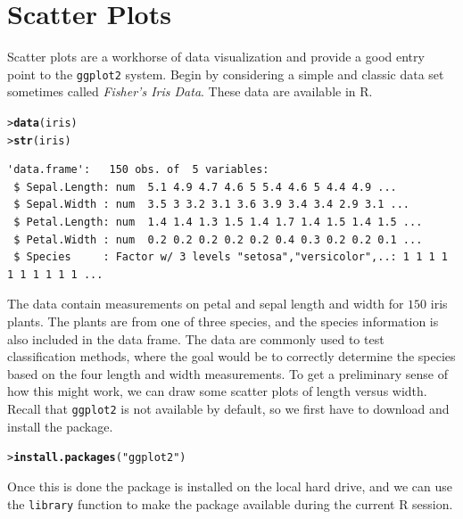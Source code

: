 \documentclass[12pt,oneside]{book}\usepackage[]{graphicx}\usepackage[]{color}
\makeatletter
\newcommand{\hlstr}[1]{\textcolor[rgb]{0.192,0.494,0.8}{#1}}%
\newcommand{\hlstd}[1]{\textcolor[rgb]{0.345,0.345,0.345}{#1}}%
\newcommand{\hlkwd}[1]{\textcolor[rgb]{0.737,0.353,0.396}{\textbf{#1}}}%
\newenvironment{kframe}{%
 \def\at@end@of@kframe{}%
 \ifinner\ifhmode%
  \def\at@end@of@kframe{\end{minipage}}%
  \begin{minipage}{\columnwidth}%
 \fi\fi%
 \def\FrameCommand##1{\hskip\@totalleftmargin \hskip-\fboxsep
 \colorbox{shadecolor}{##1}\hskip-\fboxsep
     \hskip-\linewidth \hskip-\@totalleftmargin \hskip\columnwidth}%
 \MakeFramed {\advance\hsize-\width
   \@totalleftmargin\z@ \linewidth\hsize
   \@setminipage}}%
 {\par\unskip\endMakeFramed%
 \at@end@of@kframe}
\newenvironment{knitrout}{}{} %
\makeatother
\begin{document}
\section{Scatter Plots}
Scatter plots are a workhorse of data visualization and provide a good entry point to the \verb+ggplot2+ system. Begin by considering a simple and classic data set sometimes called \emph{Fisher's Iris Data}. These data are available in R.
\begin{knitrout}
\color{fgcolor}\begin{kframe}
\begin{alltt}
\hlstd{> }\hlkwd{data}\hlstd{(iris)}
\hlstd{> }\hlkwd{str}\hlstd{(iris)}
\end{alltt}
\begin{verbatim}
'data.frame':	150 obs. of  5 variables:
 $ Sepal.Length: num  5.1 4.9 4.7 4.6 5 5.4 4.6 5 4.4 4.9 ...
 $ Sepal.Width : num  3.5 3 3.2 3.1 3.6 3.9 3.4 3.4 2.9 3.1 ...
 $ Petal.Length: num  1.4 1.4 1.3 1.5 1.4 1.7 1.4 1.5 1.4 1.5 ...
 $ Petal.Width : num  0.2 0.2 0.2 0.2 0.2 0.4 0.3 0.2 0.2 0.1 ...
 $ Species     : Factor w/ 3 levels "setosa","versicolor",..: 1 1 1 1 1 1 1 1 1 1 ...
\end{verbatim}
\end{kframe}
\end{knitrout}
The data contain measurements on petal and sepal length and width for $150$ iris plants. The plants are from one of three species, and the species information is also included in the data frame. The data are commonly used to test classification methods, where the goal would be to correctly determine the species based on the four length and width measurements. To get a preliminary sense of how this might work, we can draw some scatter plots of length versus width. Recall that \verb+ggplot2+ is not available by default, so we first have to download and install the package.
\begin{knitrout}
\color{fgcolor}\begin{kframe}
\begin{alltt}
\hlstd{> }\hlkwd{install.packages}\hlstd{(}\hlstr{"ggplot2"}\hlstd{)}
\end{alltt}
\end{kframe}
\end{knitrout}
Once this is done the package is installed on the local hard drive, and we can use the \verb+library+ function to make the package available during the current R session.
\end{document}

